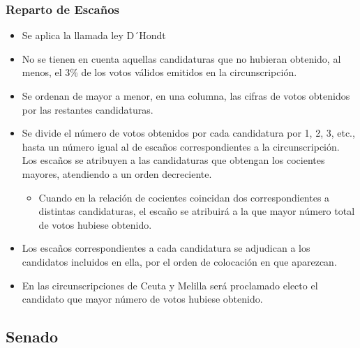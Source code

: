\documentclass[12pt,a4paper,]{book}
\providecommand{\tightlist}{%
  \setlength{\itemsep}{0pt}\setlength{\parskip}{0pt}}
\numberwithin{dummy}{section}
\theoremstyle{ocrenumbox}
\theoremstyle{blacknumex}
\theoremstyle{blacknumbox}
\theoremstyle{ocrenum}
\theoremstyle{ocrenum}
\begin{document}
\hypertarget{reparto-de-escauxf1os}{%
\subsubsection{Reparto de Escaños}\label{reparto-de-escauxf1os}}

\begin{itemize}
\item
  Se aplica la llamada ley D´Hondt
\item
  No se tienen en cuenta aquellas candidaturas que no hubieran obtenido,
  al menos, el 3\% de los votos válidos emitidos en la circunscripción.
\item
  Se ordenan de mayor a menor, en una columna, las cifras de votos
  obtenidos por las restantes candidaturas.
\item
  Se divide el número de votos obtenidos por cada candidatura por 1, 2,
  3, etc., hasta un número igual al de escaños correspondientes a la
  circunscripción. Los escaños se atribuyen a las candidaturas que
  obtengan los cocientes mayores, atendiendo a un orden decreciente.

  \begin{itemize}
  \tightlist
  \item
    Cuando en la relación de cocientes coincidan dos correspondientes a
    distintas candidaturas, el escaño se atribuirá a la que mayor número
    total de votos hubiese obtenido.
  \end{itemize}
\item
  Los escaños correspondientes a cada candidatura se adjudican a los
  candidatos incluidos en ella, por el orden de colocación en que
  aparezcan.
\item
  En las circunscripciones de Ceuta y Melilla será proclamado electo el
  candidato que mayor número de votos hubiese obtenido.
\end{itemize}

\hypertarget{senado}{%
\subsection{Senado}\label{senado}}
\end{document}
